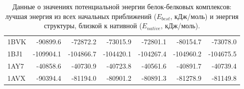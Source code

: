 \begin{table}[h]
\begin{center}
\begin{tabular}{ l | r | r | r | r | r | r }
       1BVK & -90899.6 & -72872.2 & -73015.9 & -72801.1 & -80154.7 & -73078.0 \\
       1BJ1 & -109904.1 & -104866.7 & -104420.1 & -104267.4 & -104960.2 & -104675.5 \\
       1AY7 & -40858.6 & -40730.9 & -40723.8 & -40561.6 & -40891.7 & -40739.4 \\
       1AVX & -90394.4 & -81194.0 & -80901.2 & -80891.3 & -81278.9 & -81149.8 \\
    \end{tabular}
    \end{center}
    \caption{Данные о значениях потенциальной энергии белок-белковых комплексов: лучшая энергия из всех начальных приближений ($E_{best}$, кДж/моль) и энергия структуры, близкой к нативной ($E_{native}$, кДж/моль).}
    \label{table_res_2}
  \end{table}
\fi

\FloatBarrier
